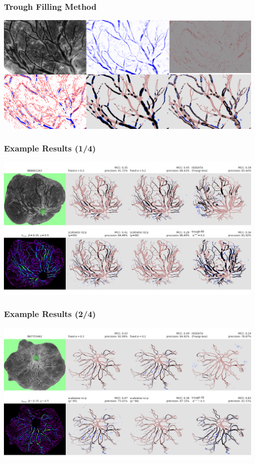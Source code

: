 \documentclass[9pt]{beamer}
\begin{document}
\begin{frame}
\frametitle{Trough Filling Method}
\includegraphics[width=\textwidth]{fig-insetBN0164923}
\end{frame}

\begin{frame}
\frametitle{Example Results (1/4)}
\includegraphics[width=\textwidth]{fig-BN8801263-semistrict-segdemo}
\end{frame}

\begin{frame}
\frametitle{Example Results (2/4)}
\includegraphics[width=\textwidth]{fig-BN7753462-semistrict-segdemo}
\end{frame}
\end{document}
